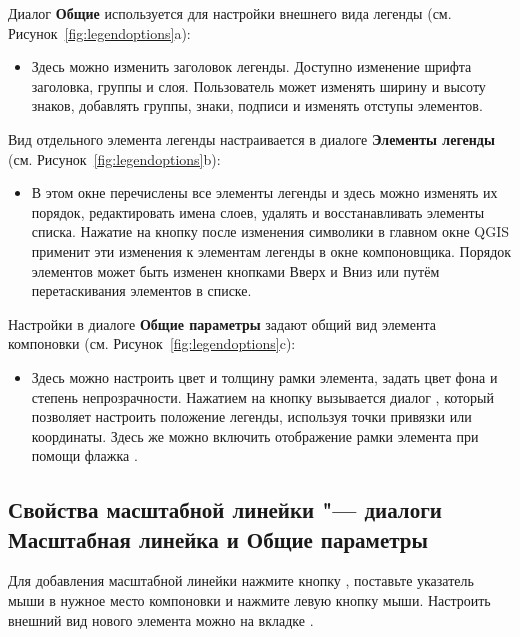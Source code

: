 
Диалог \textbf{Общие} используется для настройки внешнего вида
легенды (см. Рисунок~\ref{fig:legendoptions}a):

\begin{itemize}[label=--]
\item Здесь можно изменить заголовок легенды. Доступно изменение шрифта
заголовка, группы и слоя. Пользователь может изменять ширину и высоту
знаков, добавлять группы, знаки, подписи и изменять отступы элементов.
\end{itemize}


Вид отдельного элемента легенды настраивается в диалоге
\textbf{Элементы легенды} (см. Рисунок~\ref{fig:legendoptions}b):

\begin{itemize}[label=--]
\item В этом окне перечислены все элементы легенды и здесь можно
изменять их порядок, редактировать имена слоев, удалять и восстанавливать
элементы списка. Нажатие на кнопку  после изменения
символики в главном окне QGIS применит эти изменения к элементам
легенды в окне компоновщика. Порядок элементов может быть изменен
кнопками Вверх и Вниз или путём перетаскивания элементов в списке.
\end{itemize}


Настройки в диалоге \textbf{Общие параметры} задают общий вид
элемента компоновки (см. Рисунок~\ref{fig:legendoptions}c):

\begin{itemize}[label=--]
\item Здесь можно настроить цвет и толщину рамки элемента, задать
цвет фона и степень непрозрачности. Нажатием на кнопку
 вызывается диалог ,
который позволяет настроить положение легенды, используя точки привязки
или координаты. Здесь же можно включить отображение рамки элемента при
помощи флажка .
\end{itemize}

\subsection{Свойства масштабной линейки "--- диалоги Масштабная линейка и Общие параметры}

Для добавления масштабной линейки нажмите кнопку
, поставьте указатель
мыши в нужное место компоновки и нажмите левую кнопку мыши. Настроить
внешний вид нового элемента можно на вкладке .

